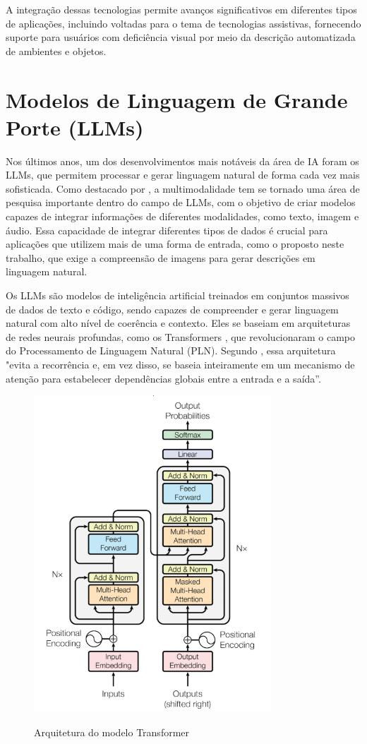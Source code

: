 A integração dessas tecnologias permite avanços significativos em diferentes tipos de aplicações, incluindo voltadas para o tema de tecnologias assistivas, fornecendo suporte para usuários com deficiência visual por meio da descrição automatizada de ambientes e objetos. 

\section{Modelos de Linguagem de Grande Porte (LLMs)}

Nos últimos anos, um dos desenvolvimentos mais notáveis da área de IA foram os LLMs, que permitem processar e gerar linguagem natural de forma cada vez mais sofisticada. Como destacado por , a multimodalidade tem se tornado uma área de pesquisa importante dentro do campo de LLMs, com o objetivo de criar modelos capazes de integrar informações de diferentes modalidades, como texto, imagem e áudio. Essa capacidade de integrar diferentes tipos de dados é crucial para aplicações que utilizem mais de uma forma de entrada, como o proposto neste trabalho, que exige a compreensão de imagens para gerar descrições em linguagem natural.

Os LLMs são modelos de inteligência artificial treinados em conjuntos massivos de dados de texto e código, sendo capazes de compreender e gerar linguagem natural com alto nível de coerência e contexto.  Eles se baseiam em arquiteturas de redes neurais profundas, como os Transformers \cite{vaswani2017}, que revolucionaram o campo do Processamento de Linguagem Natural (PLN). Segundo , essa arquitetura "evita a recorrência e, em vez disso, se baseia inteiramente em um mecanismo de atenção para estabelecer dependências globais entre a entrada e a saída”. 


\begin{figure}[!h]
     \caption{Arquitetura do modelo Transformer}
     \centering
     \includegraphics[width=0.7\linewidth]{imagens/transformers.png}
     \label{fig:2}
\end{figure}

